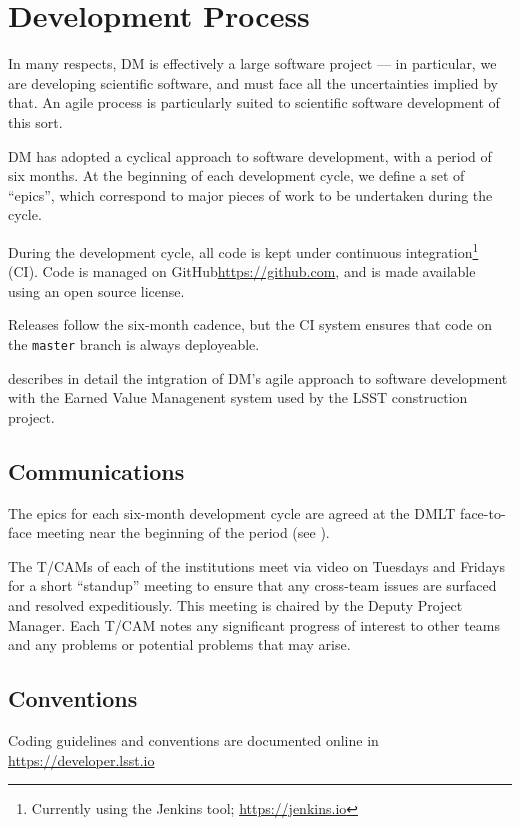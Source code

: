 \section{Development Process} \label{sect:devproc}

In many respects, \gls{DM} is effectively a large software project --- in particular, we are developing scientific software, and must face all the uncertainties implied by that.
An agile process \citep{it:agile} is particularly suited to scientific
software development of this sort.

DM has adopted a cyclical approach to software development, with a period of six months.
At the beginning of each development cycle, we define a set of ``epics'', which correspond to major pieces of work to be undertaken during the cycle.

During the development cycle, all code is kept under continuous integration\footnote{Currently using the Jenkins tool; \url{https://jenkins.io}} (\gls{CI}).
Code is managed on GitHub\url{https://github.com}, and is made available using an open source license.

Releases follow the six-month cadence, but the \gls{CI} system ensures that code on the \texttt{master} branch is always deployeable.

 describes in detail the intgration of \gls{DM}'s agile approach to software development with the \gls{Earned Value} Managenent system used by the \gls{LSST} construction project.

\subsection{Communications}

The epics for each six-month development cycle are agreed at the \gls{DMLT} face-to-face meeting near the beginning of the period (see ).

The T/CAMs of each of the institutions meet via video on Tuesdays and Fridays for a short ``standup'' meeting to ensure that any cross-team issues are surfaced and resolved expeditiously.
This meeting is chaired by the Deputy \gls{Project Manager}.
Each \gls{T/CAM} notes any significant progress of interest to other teams and any problems or potential problems that may arise.

\subsection{Conventions}
Coding guidelines and conventions are documented online in \url{https://developer.lsst.io}

